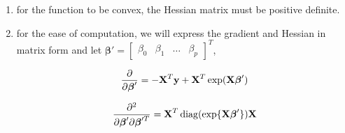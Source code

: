 \documentclass{article}
\newcommand{\vect}[1]{\boldsymbol{#1}}
\newcommand{\vectrm}[1]{\boldsymbol{\rm #1}}
\DeclareMathOperator{\diag}{diag}
\begin{document}
\begin{enumerate}[label=(\alph*)]
\item for the function to be convex, the Hessian matrix must be positive definite.

\item for the ease of computation, we will express the gradient and Hessian in matrix form and let \(\vect \beta' = \begin{bmatrix}
    \beta_0 & \beta_1 & \ldots & \beta_p
\end{bmatrix}^T\),

\[\frac{\partial}{\partial \vect \beta'} = -\vectrm X^T \vectrm y
+ \vectrm X^T \exp(\vectrm X \vect \beta')
\]

\[\frac{\partial^2}{\partial \vect \beta' \partial \vect \beta'^T} = \vectrm X^T \diag(\exp \{\vectrm X \vect \beta'\}) \vectrm X\]
\end{enumerate}
\end{document}
